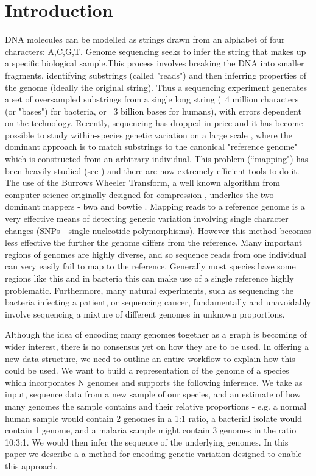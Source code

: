 \documentclass[runningheads,a4paper]{llncs}
\begin{document}
\section{Introduction}

DNA molecules can be modelled as strings drawn from an alphabet of four characters: A,C,G,T. Genome sequencing seeks to infer the string that makes up a specific biological sample.This process involves breaking the DNA into smaller fragments, identifying substrings (called "reads") and then inferring properties of the genome (ideally the original string). Thus a sequencing experiment generates a set of oversampled substrings from a single long string (~4 million characters (or "bases") for bacteria, or ~3 billion bases for humans), with errors dependent on the technology. Recently, sequencing has dropped in price and it has become possible to study within-species genetic variation on a large scale \cite{1000g,arabi,pombe}, where the dominant approach is to match substrings to the canonical "reference genome" which is constructed from an arbitrary individual.  This problem (``mapping") has been heavily studied  (see \cite{reinert}) and there are now extremely efficient tools to do it. The use of the Burrows Wheeler Transform, a well known algorithm from computer science originally designed for compression  \cite{bwt}, underlies the two dominant mappers - bwa \cite{bwa} and bowtie \cite{bowtie}. Mapping reads to a reference genome is a very effective means of detecting genetic variation involving single character changes (SNPs - single nucleotide polymorphisms). However this method becomes less effective the further the genome differs from the reference.  Many important regions of genomes are highly diverse, and so sequence reads from one individual can very easily fail to map to the reference. Generally most species have some regions like this and in bacteria this can make use of a single reference highly problematic. Furthermore, many natural experiments, such as sequencing the bacteria infecting a patient,  or sequencing cancer,  fundamentally and unavoidably involve sequencing a mixture of different genomes in unknown proportions. 

Although the idea of encoding many genomes together as a graph is becoming of wider interest, there is no consensus yet on how they are to be used. In offering a new data structure, we need to outline an entire workflow to explain how this could be used. We want to build a representation of the genome of a species which incorporates N genomes and supports the following inference. We take as input, sequence data from a new sample of our species, and  an estimate of how many genomes the sample contains and their relative proportions - e.g. a normal human sample would contain 2 genomes in a 1:1 ratio, a bacterial isolate would contain 1 genome, and a malaria sample might contain 3 genomes in the ratio 10:3:1. We would then infer the sequence of the underlying genomes. In this paper we describe a a method for encoding genetic variation designed to enable this approach. 
\end{document}

